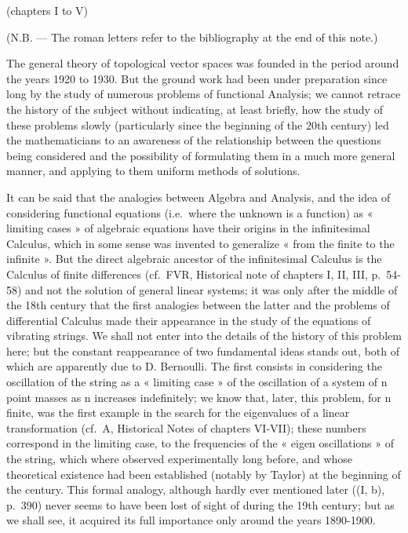 
(chapters I to V)

(N.B. --- The roman letters refer to the bibliography at the end of this note.)

The general theory of topological vector spaces was founded in the period around the years 1920 to 1930. But the ground work had been under preparation since long by the study of numerous problems of functional Analysis; we cannot retrace the history of the subject without indicating, at least briefly, how the study of these problems slowly (particularly since the beginning of the 20th century) led the mathematicians to an awareness of the relationship between the questions being considered and the possibility of formulating them in a much more general manner, and applying to them uniform methods of solutions.

It can be said that the analogies between Algebra and Analysis, and the idea of considering functional equations (i.e.~where the unknown is a function) as « limiting cases » of algebraic equations have their origins in the infinitesimal Calculus, which in some sense was invented to generalize « from the finite to the infinite ». But the direct algebraic ancestor of the infinitesimal Calculus is the Calculus of finite differences (cf.~FVR, Historical note of chapters I, II, III, p.~54-58) and not the solution of general linear systems; it was only after the middle of the 18th century that the first analogies between the latter and the problems of differential Calculus made their appearance in the study of the equations of vibrating strings. We shall not enter into the details of the history of this problem here; but the constant reappearance of two fundamental ideas stands out, both of which are apparently due to D. Bernoulli. The first consists in considering the oscillation of the string as a « limiting case » of the oscillation of a system of n point masses as n increases indefinitely; we know that, later, this problem, for n finite, was the first example in the search for the eigenvalues of a linear transformation (cf.~A, Historical Notes of chapters VI-VII); these numbers correspond in the limiting case, to the frequencies of the « eigen oscillations » of the string, which where observed experimentally long before, and whose theoretical existence had been established (notably by Taylor) at the beginning of the century. This formal analogy, although hardly ever mentioned later ((I, b), p.~390) never seems to have been lost of sight of during the 19th century; but as we shall see, it acquired its full importance only around the years 1890-1900.

